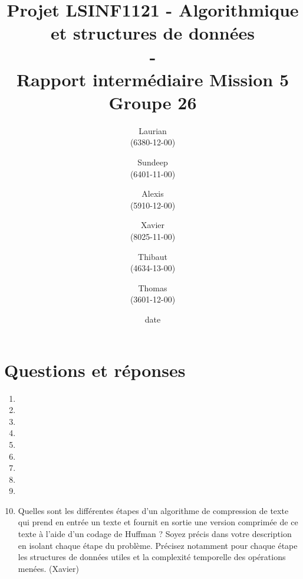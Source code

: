 \documentclass[11pt]{article}
\title{\textbf{Projet LSINF1121 -  Algorithmique et structures de données\\ - \\ Rapport intermédiaire Mission 5} \\ {\large Groupe 26}}
\author{Laurian \bsc{Detiffe} \\(6380-12-00)\and Sundeep \bsc{Dhillon} \\(6401-11-00)\and Alexis \bsc{Macq} \\ (5910-12-00) \and Xavier \bsc{Pérignon} \\ (8025-11-00)\and Thibaut \bsc{Piquard}\\(4634-13-00)\and Thomas \bsc{Wyckmans} \\ (3601-12-00)}
\date{date}
\date{\vspace*{25mm}
\texttt{[image: logo.jpg]}\\
		\vspace*{30mm}
		\begin{center}
		Année académique 2015-2016 \\	
		\end{center}}
\begin{document}
\thispagestyle{empty}

\maketitle
\thispagestyle{empty}

\section*{Questions et réponses}
\begin{enumerate}

\item
\item
\item
\item
\item
\item 
\item
\item
\item

\item Quelles sont les différentes étapes d’un algorithme de compression de texte qui
prend en entrée un texte et fournit en sortie une version comprimée de ce texte à
l’aide d’un codage de Huffman ? Soyez précis dans votre description en isolant
chaque étape du problème. Précisez notamment pour chaque étape les structures
de données utiles et la complexité temporelle des opérations menées. (Xavier)\\


\end{enumerate}
\end{document}
